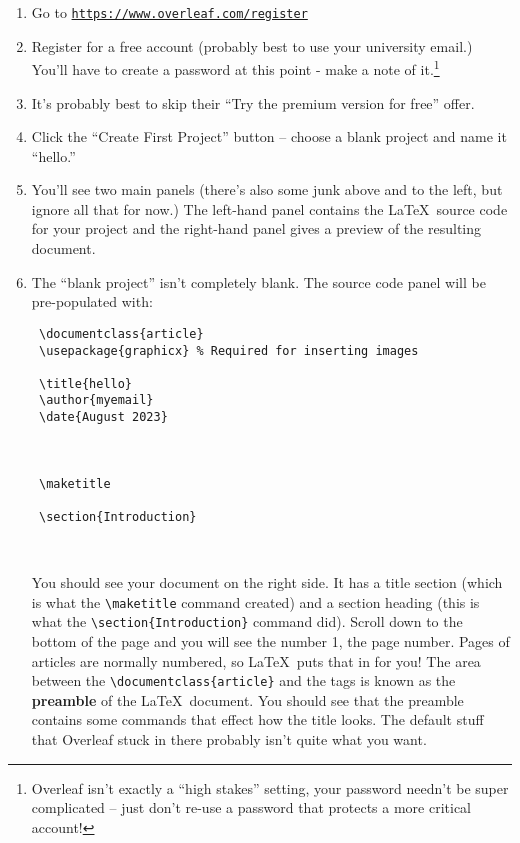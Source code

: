 \begin{enumerate}
	\item Go to \href{https://www.overleaf.com/register}{\tt https://www.overleaf.com/register}
	\item Register for a free account (probably best to use your university email.)  You'll have to create a password at this point - make a note of it.\footnote{Overleaf isn't exactly a ``high stakes'' setting, your password needn't be super complicated -- just don't re-use a password that protects a more critical account!}
	\item It's probably best to skip their ``Try the premium version for free'' offer.
    \item Click the ``Create First Project'' button -- choose a blank project and name it ``hello.''
    \item You'll see two main panels (there's also some junk above and to the left, but ignore all that for now.)  The left-hand panel contains the \LaTeX\ source code for your project and the right-hand panel gives a preview of the resulting document.
    \item The ``blank project'' isn't completely blank.  The source code panel will be pre-populated with:
\medskip

\begin{codeblock}
\begin{verbatim}
 \documentclass{article}
 \usepackage{graphicx} % Required for inserting images

 \title{hello}
 \author{myemail}
 \date{August 2023}

 

 \maketitle

 \section{Introduction}

 
\end{verbatim}
\end{codeblock}

\clearpage

You should see your document on the right side. It has a title section (which is 
what the \verb+\maketitle+ command created) and a section heading (this is what the \verb+\section{Introduction}+ command did). Scroll down to the bottom of the page and you
will see the number 1, the page number. Pages of articles are normally
numbered, so \LaTeX\  puts that in for you!  The area
between the \verb+\documentclass{article}+ and
the \verb++ tags is known
as the \textbf{preamble} of the \LaTeX\  document. 
You should see that the preamble contains some commands that effect how the title looks.  
The default stuff that Overleaf stuck in there probably isn't quite what you want.


\end{enumerate}
